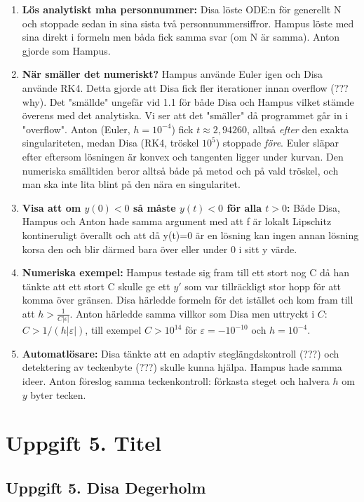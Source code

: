 \documentclass{article}
\begin{document}
\begin{enumerate}
    \item \textbf{Lös analytiskt mha personnummer:} Disa löste ODE:n för generellt N och stoppade sedan in sina sista två personnummersiffror. Hampus löste med sina direkt i formeln men båda fick samma svar (om N är samma). Anton gjorde som Hampus. 
    \item \textbf{När smäller det numeriskt?} Hampus använde Euler igen och Disa använde RK4. Detta gjorde att Disa fick fler iterationer innan overflow (??? why). Det "smällde" ungefär vid 1.1 för både Disa och Hampus vilket stämde överens med det analytiska. Vi ser att det "smäller" då programmet går in i "overflow". Anton (Euler, $h = 10^{-4}$) fick $t \approx 2{,}94260$, alltså \emph{efter} den
    exakta singulariteten, medan Disa (RK4, tröskel $10^{5}$) stoppade \emph{före}.
    Euler släpar efter eftersom lösningen är konvex och tangenten ligger under
    kurvan. Den numeriska smälltiden beror alltså både på metod och på vald
    tröskel, och man ska inte lita blint på den nära en singularitet.
    \item \textbf{Visa att om $y(0)<0$ så måste $y(t)<0$ för alla $t>0$:} Både Disa, Hampus och Anton hade samma argument med att f är lokalt Lipschitz kontineruligt överallt och att då y(t)=0 är en lösning kan ingen annan lösning korsa den och blir därmed bara över eller under 0 i sitt y värde.
    \item \textbf{Numeriska exempel:} Hampus testade sig fram till ett stort nog C då han tänkte att ett stort C skulle ge ett $y'$ som var tillräckligt stor hopp för att komma över gränsen. Disa härledde formeln för det istället och kom fram till att $h > \frac{1}{C |\epsilon|}$. Anton härledde samma villkor som Disa men uttryckt i $C$: $C > 1/(h|\varepsilon|)$,
    till exempel $C > 10^{14}$ för $\varepsilon = -10^{-10}$ och $h = 10^{-4}$.
    \item \textbf{Automatlösare:} Disa tänkte att en adaptiv steglängdskontroll (???) och detektering av teckenbyte (???) skulle kunna hjälpa. Hampus hade samma ideer. Anton föreslog samma teckenkontroll: förkasta steget och halvera $h$ om $y$
    byter tecken.
    \end{enumerate}

\section*{Uppgift 5. Titel}

\subsection*{Uppgift 5. Disa Degerholm}
\end{document}
